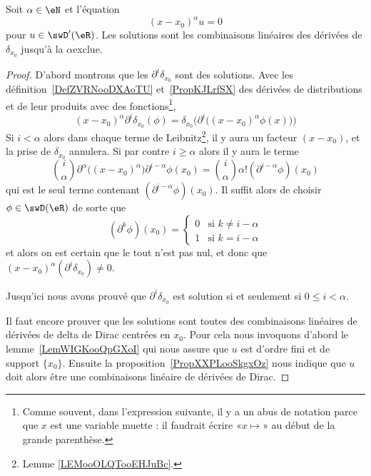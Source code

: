 \begin{theorem}     \label{ThoRDUXooQBlLNb}
	Soit \( \alpha\in \eN\) et l'équation
	\begin{equation}        \label{EqDONTooKPfDWU}
		(x-x_0)^{\alpha}u=0
	\end{equation}
	pour \( u\in\swD'(\eR)\). Les solutions sont les combinaisons linéaires des dérivées de \( \delta_{x_0}\) jusqu'à la \( \alpha\)\ieme exclue.
\end{theorem}

\begin{proof}
	D'abord montrons que les \( \partial^i\delta_{x_0}\) sont des solutions. Avec les définition~\ref{DefZVRNooDXAoTU} et~\ref{PropKJLrfSX} des dérivées de distributions et de leur produits avec des fonctions\footnote{Comme souvent, dans l'expression suivante, il y a un abus de notation parce que \( x\) est une variable muette : il faudrait écrire «\( x\mapsto\)» au début de la grande parenthèse.},
	\begin{equation}
		(x-x_0)^{\alpha}\partial^i\delta_{x_0}(\phi)=\delta_{x_0}\Big( \partial^i\big( (x-x_0)^{\alpha}\phi(x) \big) \Big)
	\end{equation}
	Si \( i<\alpha\) alors dans chaque terme de Leibnitz\footnote{Lemme \ref{LEMooOLQTooEHJuBc}.}, il y aura un facteur \( (x-x_0)\), et la prise de \( \delta_{x_0}\) annulera. Si par contre \( i\geq \alpha\) alors il y aura le terme
	\begin{equation}
		\binom{ i }{ \alpha }\partial^{\alpha}\big( (x-x_0)^{\alpha} \big)\partial^{i-\alpha}\phi(x_0)=\binom{ i }{ \alpha }\alpha!(\partial^{i-\alpha}\phi)(x_0)
	\end{equation}
	qui est le seul terme contenant \( (\partial^{i-\alpha}\phi)(x_0)\). Il suffit alors de choisir \( \phi\in\swD(\eR) \) de sorte que
	\begin{equation}
		(\partial^k\phi)(x_0)=\begin{cases}
			0 & \text{si } k\neq i-\alpha \\
			1 & \text{si } k=i-\alpha
		\end{cases}
	\end{equation}
	et alors on est certain que le tout n'est pas nul, et donc que \( (x-x_0)^{\alpha}(\partial^i\delta_{x_0})\neq 0\).

	Jusqu'ici nous avons prouvé que \( \partial^i\delta_{x_0}\) est solution si et seulement si \( 0\leq i<\alpha\).

	Il faut encore prouver que les solutions sont toutes des combinaisons linéaires de dérivées de delta de Dirac centrées en \( x_0\). Pour cela nous invoquons d'abord le lemme~\ref{LemWIGKooQpGXoI} qui nous assure que \( u\) est d'ordre fini et de support \( \{ x_0 \}\). Ensuite la proposition~\ref{PropXXPLooSkgxOz} nous indique que \( u\) doit alors être une combinaisons linéaire de dérivées de Dirac.
\end{proof}

